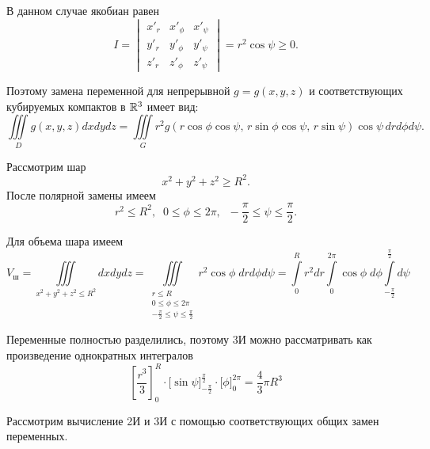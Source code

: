 \documentclass[../../main.tex]{subfiles}
\begin{document}
\begin{iex}
\begin{itemize}
			В данном случае якобиан равен
			\[I = \begin{vmatrix}
				x'_r & x'_\phi & x'_\psi \\
				y'_r & y'_\phi & y'_\psi \\
				z'_r & z'_\phi & z'_\psi
			\end{vmatrix}=r^2\cos{\psi}\geq 0.\]
			
			Поэтому замена переменной для непрерывной $g=g(x, y, z)$ и соответствующих
			кубируемых компактов в $\mathbb{R}^3$ имеет вид:
			\begin{equation}
			\label{lec15:45}
			\iiint\limits_{D} g(x, y, z) dx dy dz=
			\iiint\limits_{G} r^2g(r \cos{\phi} \cos{\psi},\, r \sin{\phi} \cos{\psi},\,
			 r \sin{\psi})\cos{\psi}\, dr d\phi d\psi.
			\end{equation}
		\end{itemize}
	\end{iex}

	\begin{exmp}
		Рассмотрим шар
		\[x^2 + y^2 + z^2 \geq R^2.\]
		После полярной замены имеем \[r^2 \leq R^2, \;\; 0 \leq \phi \leq 2\pi, 
		\;\; -\dfrac{\pi}{2} \leq \psi \leq \dfrac{\pi}{2}.\]
		
		Для объема шара имеем
		\[V_{\text{ш}} = \iiint\limits_{x^2 + y^2 + z^2 \leq R^2} dxdydz = 
		\iiint\limits_{
			\substack{
			r \leq R\\
			0 \leq \phi \leq 2\pi\\
			-\frac{\pi}{2} \leq \psi \leq \frac{\pi}{2}
			}
		}r^2\cos \phi \; dr d\phi d\psi = \int\limits_{0}^{R}r^2dr\int\limits_{0}^
	{2\pi}\cos\phi \; d\phi \int\limits_{-\frac{\pi}{2}}^{\frac{\pi}{2}}d\psi\]
		
		Переменные полностью разделились, поэтому 3И можно рассматривать как 
		произведение
		 однократных интегралов
		\[
		\left[\dfrac{r^3}{3}\right]_{0}^{R} \cdot \Big[\sin \psi 
		\Big]_{-\frac{\pi}{2}}^{\frac{\pi}{2}} \cdot \Big[\phi\Big]_{0}^{2\pi} = 
		\dfrac{4}{3} \pi R^3 
		\]
	\end{exmp}
	
	Рассмотрим вычисление 2И и 3И с помощью соответствующих общих замен 
	переменных. 
	
\end{document}
